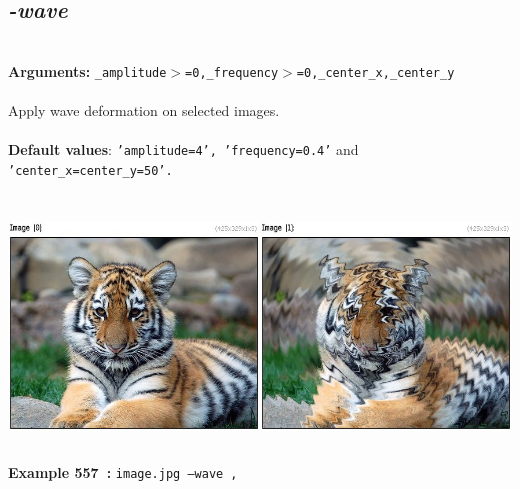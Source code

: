 \documentclass[a4paper,11pt,twoside]{book}
\begin{document}
\subsection{\emph{-wave} }\vspace*{-0.5em}
~\\\textbf{Arguments: } 
{\small \texttt{\_amplitude$>$=0,\_frequency$>$=0,\_center\_x,\_center\_y}}\\~\\
Apply wave deformation on selected images.
~\\~\\\textbf{Default values}: {\small \texttt{'amplitude=4', 'frequency=0.4'} and \texttt{'center\_x=center\_y=50'.}}
\begin{center}\includegraphics[keepaspectratio=true,height=7cm,width=\textwidth]{img/gmic_def557.jpg}\\
{\footnotesize \textbf{Example 557~:} \texttt{image.jpg --wave ,}}
\end{center}
\end{document}
